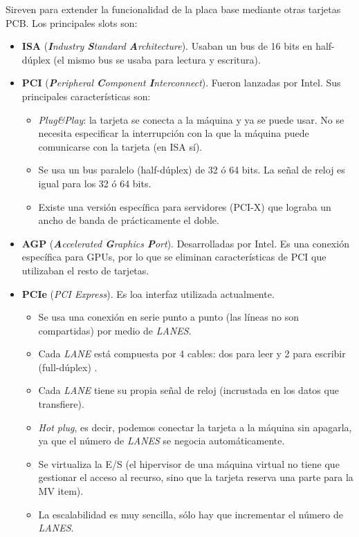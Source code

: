\documentclass[12pt,spanish]{article}
\begin{document}
Sireven para extender la funcionalidad de la placa base mediante otras tarjetas PCB. Los principales slots son:
\begin{itemize}
	\item \textbf{ISA} (\textit{\textbf{I}ndustry \textbf{S}tandard \textbf{A}rchitecture}). Usaban un bus de 16 bits en half-dúplex (el mismo bus se usaba para lectura y escritura).
	\item \textbf{PCI} (\textit{\textbf{P}eripheral \textbf{C}omponent \textbf{I}nterconnect}). Fueron lanzadas por Intel. Sus principales características son:
		\begin{itemize}
			\item \textit{Plug\&Play}: la tarjeta se conecta a la máquina y ya se puede usar. No se necesita especificar la interrupción con la que la máquina puede comunicarse con la tarjeta (en ISA sí).
			\item Se usa un bus paralelo (half-dúplex) de 32 ó 64 bits. La señal de reloj es igual para los 32 ó 64 bits.
			\item Existe una versión específica para servidores (PCI-X) que lograba un ancho de banda de prácticamente el doble.
		\end{itemize}
		\item \textbf{AGP} (\textit{\textbf{A}ccelerated \textbf{G}raphics \textbf{P}ort}). Desarrolladas por Intel. Es una conexión específica para GPUs, por lo que se eliminan características de PCI que utilizaban el resto de tarjetas.
		\item \textbf{PCIe} (\textit{PCI Express}). Es loa interfaz utilizada actualmente.
		\begin{itemize}
			\item Se usa una conexión en serie punto a punto (las líneas no son compartidas) por medio de \textit{LANES}.
			\item Cada \textit{LANE} está compuesta por 4 cables: dos para leer y 2 para escribir (full-dúplex) .
			\item Cada \textit{LANE} tiene su propia señal de reloj (incrustada en los datos que transfiere).
			\item \textit{Hot plug}, es decir, podemos conectar la tarjeta a la máquina sin apagarla, ya que el número de \textit{LANES} se negocia automáticamente.
			\item Se virtualiza la E/S (el hipervisor de una máquina virtual no tiene que gestionar el acceso al recurso, sino que la tarjeta reserva una parte para la MV	item).
			\item La escalabilidad es muy sencilla, sólo hay que incrementar el número de \textit{LANES}.

\end{itemize}
\end{itemize}
\end{document}
